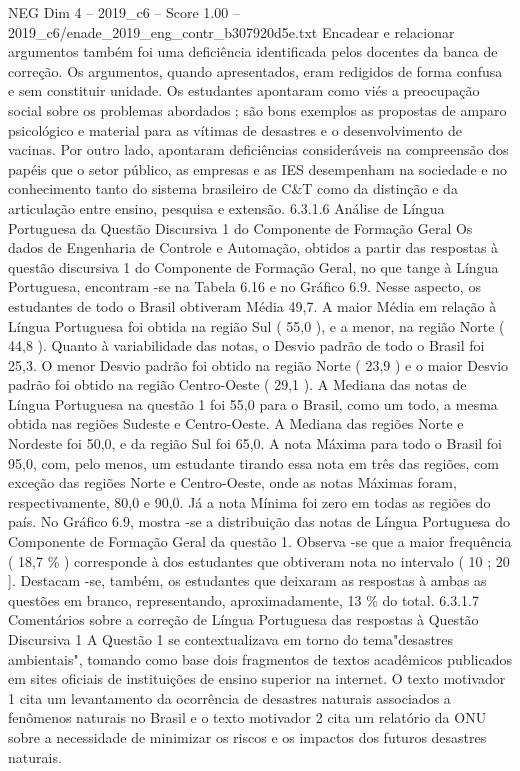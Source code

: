\begin{textsample}{NEG Dim 4 – 2019\_c6 – Score 1.00 – 2019\_c6/enade\_2019\_eng\_contr\_b307920d5e.txt}
Encadear e relacionar argumentos também foi uma deficiência identificada pelos docentes da banca de correção.
Os argumentos, quando apresentados, eram redigidos de forma confusa e sem constituir unidade.
Os estudantes apontaram como viés a preocupação social sobre os problemas abordados ; são bons exemplos as propostas de amparo psicológico e material para as vítimas de desastres e o desenvolvimento de vacinas.
Por outro lado, apontaram deficiências consideráveis na compreensão dos papéis que o setor público, as empresas e as IES desempenham na sociedade e no conhecimento tanto do sistema brasileiro de C\&T como da distinção e da articulação entre ensino, pesquisa e extensão. 6.3.1.6 Análise de Língua Portuguesa da Questão Discursiva 1 do Componente de Formação Geral Os dados de Engenharia de Controle e Automação, obtidos a partir das respostas à questão discursiva 1 do Componente de Formação Geral, no que tange à Língua Portuguesa, encontram -se na Tabela 6.16 e no Gráfico 6.9.
Nesse aspecto, os estudantes de todo o Brasil obtiveram Média 49,7.
A maior Média em relação à Língua Portuguesa foi obtida na região Sul ( 55,0 ), e a menor, na região Norte ( 44,8 ).
Quanto à variabilidade das notas, o Desvio padrão de todo o Brasil foi 25,3.
O menor Desvio padrão foi obtido na região Norte ( 23,9 ) e o maior Desvio padrão foi obtido na região Centro-Oeste ( 29,1 ).
A Mediana das notas de Língua Portuguesa na questão 1 foi 55,0 para o Brasil, como um todo, a mesma obtida nas regiões Sudeste e Centro-Oeste.
A Mediana das regiões Norte e Nordeste foi 50,0, e da região Sul foi 65,0.
A nota Máxima para todo o Brasil foi 95,0, com, pelo menos, um estudante tirando essa nota em três das regiões, com exceção das regiões Norte e Centro-Oeste, onde as notas Máximas foram, respectivamente, 80,0 e 90,0.
Já a nota Mínima foi zero em todas as regiões do país.
No Gráfico 6.9, mostra -se a distribuição das notas de Língua Portuguesa do Componente de Formação Geral da questão 1.
Observa -se que a maior frequência ( 18,7 \% ) corresponde à dos estudantes que obtiveram nota no intervalo ( 10 ; 20 ].
Destacam -se, também, os estudantes que deixaram as respostas à ambas as questões em branco, representando, aproximadamente, 13 \% do total. 6.3.1.7 Comentários sobre a correção de Língua Portuguesa das respostas à Questão Discursiva 1 A Questão 1 se contextualizava em torno do tema"desastres ambientais", tomando como base dois fragmentos de textos acadêmicos publicados em sites oficiais de instituições de ensino superior na internet.
O texto motivador 1 cita um levantamento da ocorrência de desastres naturais associados a fenômenos naturais no Brasil e o texto motivador 2 cita um relatório da ONU sobre a necessidade de minimizar os riscos e os impactos dos futuros desastres naturais.

\end{textsample}
